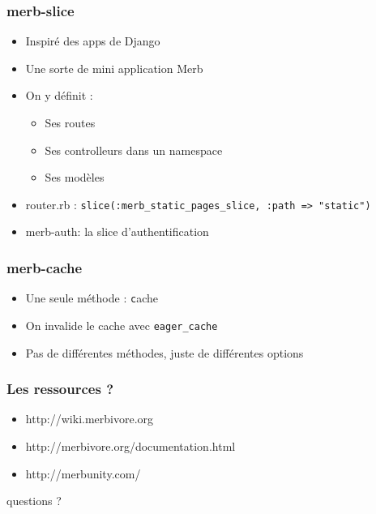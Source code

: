 \documentclass{beamer}
\begin{document}
\begin{frame}
    \frametitle{merb-slice}
    \begin{itemize}
        \item Inspiré des apps de Django
        \item Une sorte de mini application Merb
        \item On y définit :
        \begin{itemize}
            \item Ses routes
            \item Ses controlleurs dans un namespace
            \item Ses modèles
        \end{itemize}
        \item router.rb : \texttt{slice(:merb\_static\_pages\_slice, :path => "static")}
        \item merb-auth: la slice d'authentification
    \end{itemize}
\end{frame}

\begin{frame}
    \frametitle{merb-cache}
    \begin{itemize}
        \item Une seule méthode : \texttt cache
        \item On invalide le cache avec \texttt{eager\_cache}
        \item Pas de différentes méthodes, juste de différentes options
    \end{itemize}
\end{frame}

\begin{frame}
    \begin{center}
        
    \end{center}
\end{frame}

\begin{frame}
    \frametitle{Les ressources ?}
    \begin{itemize}
        \item http://wiki.merbivore.org
        \item http://merbivore.org/documentation.html
        \item http://merbunity.com/
    \end{itemize}
\end{frame}

\begin{frame}
    \begin{center}
    \huge{}
    questions ?
    \end{center}
\end{frame}
\end{document}
